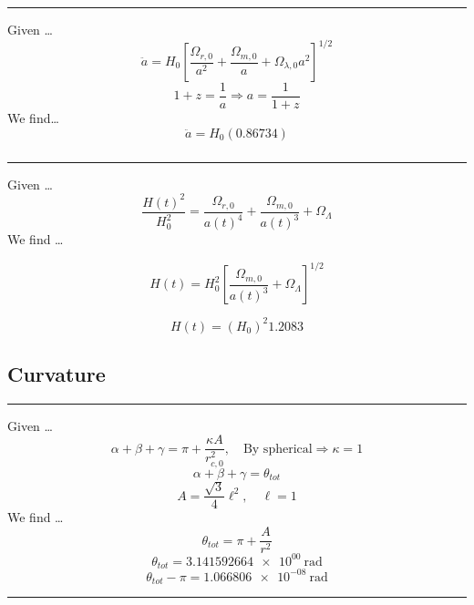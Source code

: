 \documentclass{article}
\begin{document}
\subsubsection{}
\hrule
\vspace{.5cm}

Given \dots 
\[\ddot{a} = H_0\left[\frac{\Omega_{r,0}}{a^2} + \frac{\Omega_{m,0}}{a}+ \Omega_{\lambda,0}a^2\right]^{1/2}\]
\[1 + z = \frac{1}{a} \Rightarrow a = \frac{1}{1+z}\]
We find\dots 
\[\boxed{\ddot{a} = H_0 (0.86734)}\]


\subsubsection{}
\hrule
\vspace{.5cm}
Given \dots 
\[\frac{H(t)^2}{H_0^2} = \frac{\Omega_{r,0}}{a(t)^4} + \frac{\Omega_{m,0}}{a(t)^3} + \Omega_{\Lambda}\]
We find \dots 

\[{H(t)} = {H_0^2}\left[\frac{\Omega_{m,0}}{a(t)^3} + \Omega_{\Lambda}\right]^{1/2}\]

\[\boxed{H(t) = (H_0)^2 1.2083}\]



\subsection{Curvature}
\hrule
\vspace{.5cm}

Given \dots 
\[\alpha + \beta + \gamma = \pi + \frac{\kappa A}{r^2_{c,0}}, \quad \text{By spherical} \Rightarrow \kappa = 1\]
\[\alpha + \beta + \gamma = \theta_{tot}\]
\[A = \frac{\sqrt{3}}{4} \ell^2, \quad \ell = 1\]
We find \dots 
\[\theta_{tot} = \pi + \frac{A}{r^2}\]
\[\boxed{\theta_{tot} = \SI{3.141592664e+00}{\radian}}\]
\[\boxed{\theta_{tot} - \pi = \SI{1.066806e-08}{\radian}}\]
\hrule
\end{document}
